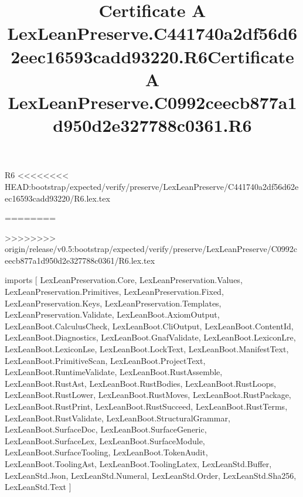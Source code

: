 \begin{lexlean}{R6}
<<<<<<<< HEAD:bootstrap/expected/verify/preserve/LexLeanPreserve/C441740a2df56d62eec16593cadd93220/R6.lex.tex
\title{Certificate A LexLeanPreserve.C441740a2df56d62eec16593cadd93220.R6}
========
\title{Certificate A LexLeanPreserve.C0992ceecb877a1d950d2e327788c0361.R6}
>>>>>>>> origin/release/v0.5:bootstrap/expected/verify/preserve/LexLeanPreserve/C0992ceecb877a1d950d2e327788c0361/R6.lex.tex
\begin{coremodule}
imports [
  LexLeanPreservation.Core,
  LexLeanPreservation.Values,
  LexLeanPreservation.Primitives,
  LexLeanPreservation.Fixed,
  LexLeanPreservation.Keys,
  LexLeanPreservation.Templates,
  LexLeanPreservation.Validate,
  LexLeanBoot.AxiomOutput,
  LexLeanBoot.CalculusCheck,
  LexLeanBoot.CliOutput,
  LexLeanBoot.ContentId,
  LexLeanBoot.Diagnostics,
  LexLeanBoot.GnafValidate,
  LexLeanBoot.LexiconLre,
  LexLeanBoot.LexiconLse,
  LexLeanBoot.LockText,
  LexLeanBoot.ManifestText,
  LexLeanBoot.PrimitiveScan,
  LexLeanBoot.ProjectText,
  LexLeanBoot.RuntimeValidate,
  LexLeanBoot.RustAssemble,
  LexLeanBoot.RustAst,
  LexLeanBoot.RustBodies,
  LexLeanBoot.RustLoops,
  LexLeanBoot.RustLower,
  LexLeanBoot.RustMoves,
  LexLeanBoot.RustPackage,
  LexLeanBoot.RustPrint,
  LexLeanBoot.RustSucceed,
  LexLeanBoot.RustTerms,
  LexLeanBoot.RustValidate,
  LexLeanBoot.StructuralGrammar,
  LexLeanBoot.SurfaceDoc,
  LexLeanBoot.SurfaceGeneric,
  LexLeanBoot.SurfaceLex,
  LexLeanBoot.SurfaceModule,
  LexLeanBoot.SurfaceTooling,
  LexLeanBoot.TokenAudit,
  LexLeanBoot.ToolingAst,
  LexLeanBoot.ToolingLatex,
  LexLeanStd.Buffer,
  LexLeanStd.Json,
  LexLeanStd.Numeral,
  LexLeanStd.Order,
  LexLeanStd.Sha256,
  LexLeanStd.Text
]


\end{coremodule}
\end{lexlean}
